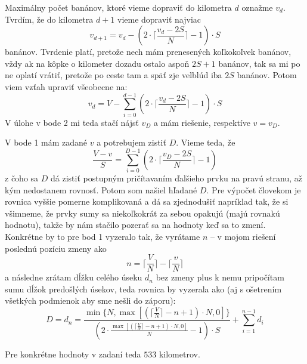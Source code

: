 
Maximálny počet banánov, ktoré vieme dopraviť do kilometra $d$ oznažme 
$v_d$. Tvrdím, že do kilometra $d+1$ vieme dopraviť najviac 
$$v_{d+1} = v_d - (2\cdot\lceil\dfrac{v_d-2S}{N}\rceil -1)\cdot S$$
banánov. Tvrdenie platí, pretože nech mám prenesených koľkokoľvek 
banánov, vždy ak na kôpke o kilometer dozadu ostalo aspoň $2S+1$ 
banánov, tak sa mi po ne oplatí vrátiť, pretože po ceste tam a späť zje 
velblúd iba $2S$ banánov. Potom viem vzťah upraviť všeobecne na:
$$v_d = V-\sum_{i = 0}^{d-1}(2\cdot\lceil\dfrac{v_d-2S}{N}\rceil -1)\cdot S$$
V úlohe v bode 2 mi teda stačí nájsť $v_D$ a mám riešenie, respektíve 
$v=v_D$.

V bode 1 mám zadané $v$ a potrebujem zistiť $D$. Vieme teda, že 
$$\dfrac{V-v}{S} = \sum_{i = 0}^{D-1}(2\cdot\lceil\dfrac{v_D-2S}{N}\rceil -1)$$
z čoho sa $D$ dá zistiť postupným pričítavaním ďalšieho prvku na pravú 
stranu, až kým nedostanem rovnosť. Potom som našiel hľadané $D$. Pre 
výpočet človekom je rovnica vyššie pomerne komplikovaná a dá sa 
zjednodušiť napríklad tak, že si všimneme, že prvky sumy sa niekoľkokrát 
za sebou opakujú (majú rovnakú hodnotu), takže by nám stačilo pozerať sa 
na hodnoty keď sa to zmení. Konkrétne by to pre bod 1 vyzeralo tak, že 
vyrátame $n$ -- v mojom riešení poslednú pozíciu zmeny ako 
$$n=\lceil\frac{V}{N}\rceil -\lceil\frac{v}{N}\rceil$$
a následne zrátam dĺžku celého úseku $d_n$ bez zmeny plus k nemu 
pripočítam sumu dĺžok predošlých úsekov, teda rovnica by vyzerala ako 
(aj s ošetrením všetkých podmienok aby sme nešli do záporu):
\[D = d_n = \frac{\min\{N, \max [(\lceil\frac{V}{N}\rceil -n+1)\cdot N, 
0]\}}{(2\cdot\frac{\max [(\lceil\frac{V}{N}\rceil -n+1)\cdot N, 
0]}{N}-1)\cdot S}+\sum_{i = 1}^{n-1}  d_i\]

Pre konkrétne hodnoty v zadaní teda $533$ kilometrov. 

